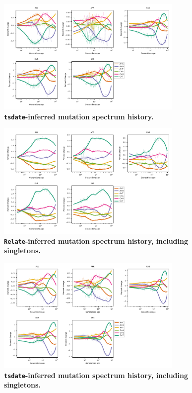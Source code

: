 \documentclass[]{article}
\begin{document}
\begin{figure}[ht!]
    \centering
    \includegraphics[width=0.8\textwidth]{../plots/spectrum_history.tsdate.max_age.10000.pdf}
    \caption{
        \textbf{\texttt{tsdate}-inferred mutation spectrum history.}
    }
    \label{fig:tsdate-spectra}
\end{figure}

\begin{figure}[ht!]
    \centering
    \includegraphics[width=0.8\textwidth]{../plots/spectrum_history.relate.max_age.10000.singletons.pdf}
    \caption{
        \textbf{\texttt{Relate}-inferred mutation spectrum history, including singletons.}
    }
    \label{fig:relate-spectra}
\end{figure}

\begin{figure}[ht!]
    \centering
    \includegraphics[width=0.8\textwidth]{../plots/spectrum_history.tsdate.max_age.10000.singletons.pdf}
    \caption{
        \textbf{\texttt{tsdate}-inferred mutation spectrum history, including singletons.}
    }
    \label{fig:tsdate-spectra}
\end{figure}
\end{document}
